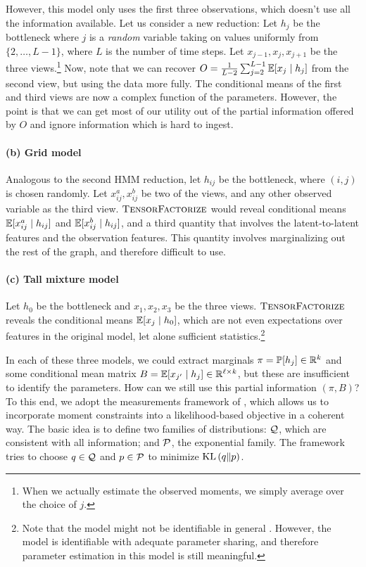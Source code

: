 However, this model only uses the first three observations,
which doesn't use all the information available.
Let us consider a new reduction:
Let $h_j$ be the bottleneck where $j$ is a \emph{random} variable
taking on values uniformly from $\{2,
\dots, L-1\}$, where $L$ is the number of time steps.
Let $x_{j-1},x_j,x_{j+1}$ be the three views.\footnote{
When we actually estimate the observed moments, we simply average over the choice of $j$.}
Now, note that we can recover $O = \frac{1}{L-2} \sum_{j=2}^{L-1} \mathbb{E}[x_j \mid h_j]$ from the second view,
but using the data more fully.  The conditional means of the first and third
views are now a complex function of the parameters.
However, the point is that we can get most of our utility out of the partial
information offered by $O$ and ignore information which is hard to ingest.

\paragraph{(b) Grid model}
Analogous to the second HMM reduction, let $h_{ij}$ be the bottleneck,
where $(i,j)$ is chosen randomly.
Let $x_{ij}^a,x_{ij}^b$ be two of the views, and any other observed variable as the third view.
$\text{\sc TensorFactorize}$ would reveal conditional means $\mathbb{E}[x_{ij}^a \mid h_{ij}]$
and $\mathbb{E}[x_{ij}^b \mid h_{ij}]$,
and a third quantity that involves the latent-to-latent features and the observation features.
This quantity involves marginalizing out the rest of the graph,
and therefore difficult to use.

\paragraph{(c) Tall mixture model}
Let $h_0$ be the bottleneck and $x_1,x_2,x_3$ be the three
views.
$\text{\sc TensorFactorize}$ reveals the conditional means $\mathbb{E}[x_j \mid h_0]$, which are
not even expectations over features in the original model, let alone sufficient
statistics.\footnote{Note that
the model might not be identifiable in general \cite{anandkumar11tree}.
However, the model is identifiable with adequate parameter sharing,
and therefore
parameter estimation in this model is still meaningful.}

In each of these three models, we could extract marginals $\pi = \mathbb{P}[h_j] \in \mathbb{R}^{k}$
and some conditional mean matrix $B = \mathbb{E}[x_{j'} \mid h_j] \in \mathbb{R}^{\ell \times k}$,
but these are insufficient to identify the parameters.
How can we still use this partial information $(\pi,B)$?
To this end, we adopt the measurements framework of \citet{liang09measurements},
which allows us to incorporate moment constraints into a likelihood-based objective in a coherent way.
The basic idea is to define two families of distributions:
$\mathcal{Q}$, which are consistent with all information; and
$\mathcal{P}$, the exponential family.  The
framework tries to choose $q \in \mathcal{Q}$ and $p \in \mathcal{P}$ to minimize
$\text{KL}\left( q \| p \right)$.


